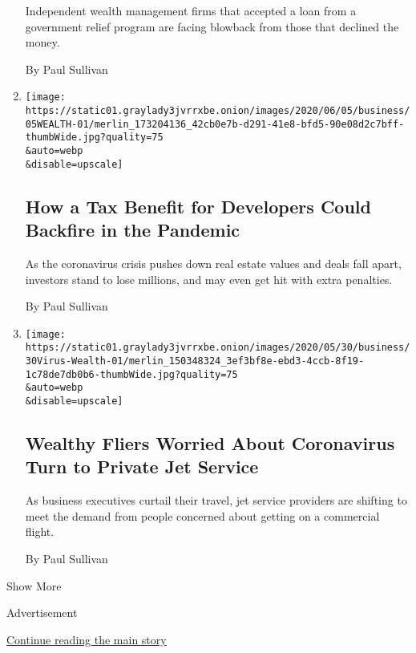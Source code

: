 \begin{enumerate}
  Independent wealth management firms that accepted a loan from a
  government relief program are facing blowback from those that declined
  the money.

  By Paul Sullivan
\item
  \href{/2020/06/05/your-money/coronavirus-1031-exchange-tax.html}{}

  \texttt{[image: https://static01.graylady3jvrrxbe.onion/images/2020/06/05/business/05WEALTH-01/merlin\_173204136\_42cb0e7b-d291-41e8-bfd5-90e08d2c7bff-thumbWide.jpg?quality=75\\\&auto=webp\\\&disable=upscale]}

  \hypertarget{how-a-tax-benefit-for-developers-could-backfire-in-the-pandemic}{%
  \subsection{How a Tax Benefit for Developers Could Backfire in the
  Pandemic}\label{how-a-tax-benefit-for-developers-could-backfire-in-the-pandemic}}

  As the coronavirus crisis pushes down real estate values and deals
  fall apart, investors stand to lose millions, and may even get hit
  with extra penalties.

  By Paul Sullivan
\item
  \href{/2020/05/30/your-money/coronavirus-private-jets.html}{}

  \texttt{[image: https://static01.graylady3jvrrxbe.onion/images/2020/05/30/business/30Virus-Wealth-01/merlin\_150348324\_3ef3bf8e-ebd3-4ccb-8f19-1c78de7db0b6-thumbWide.jpg?quality=75\\\&auto=webp\\\&disable=upscale]}

  \hypertarget{wealthy-fliers-worried-about-coronavirus-turn-to-private-jet-service}{%
  \subsection{Wealthy Fliers Worried About Coronavirus Turn to Private
  Jet
  Service}\label{wealthy-fliers-worried-about-coronavirus-turn-to-private-jet-service}}

  As business executives curtail their travel, jet service providers are
  shifting to meet the demand from people concerned about getting on a
  commercial flight.

  By Paul Sullivan
\end{enumerate}

Show More

Advertisement

\protect\hyperlink{after-mid1}{Continue reading the main story}

